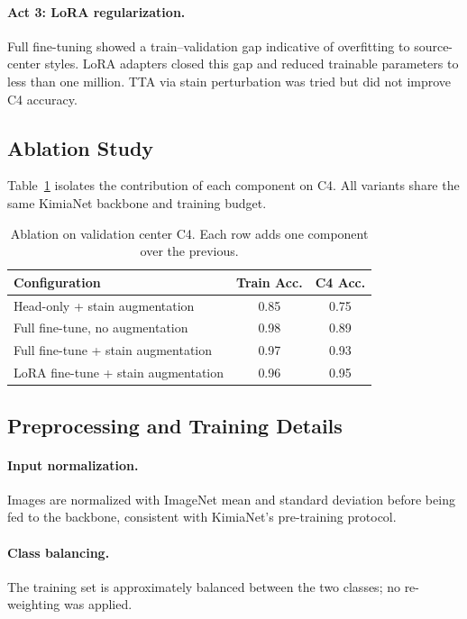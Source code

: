 \documentclass{midl}
\begin{document}
\paragraph{Act 3: LoRA regularization.}
Full fine-tuning showed a train–validation gap indicative of overfitting to source-center
styles. LoRA adapters closed this gap and reduced trainable parameters to less than one million. TTA via stain perturbation was tried but did not improve C4 accuracy.

\subsection{Ablation Study}

Table~\ref{tab:ablation} isolates the contribution of each component on C4. All variants
share the same KimiaNet backbone and training budget.

\begin{table}[H]
    \centering
    \small
    \caption{Ablation on validation center C4. Each row adds one component over the previous.}
    \label{tab:ablation}
    \begin{tabular}{lcc}
        \toprule
        \textbf{Configuration} & \textbf{Train Acc.} & \textbf{C4 Acc.} \\
        \midrule
        Head-only + stain augmentation      & 0.85 & 0.75 \\
        Full fine-tune, no augmentation     & 0.98 & 0.89 \\
        Full fine-tune + stain augmentation & 0.97 & 0.93 \\
        LoRA fine-tune + stain augmentation & 0.96 & 0.95 \\
        \bottomrule
    \end{tabular}
\end{table}

\subsection{Preprocessing and Training Details}

\paragraph{Input normalization.}
Images are normalized with ImageNet mean and standard deviation before being fed to the
backbone, consistent with KimiaNet's pre-training protocol.

\paragraph{Class balancing.}
The training set is approximately balanced between the two classes; no re-weighting was
applied.
\end{document}

